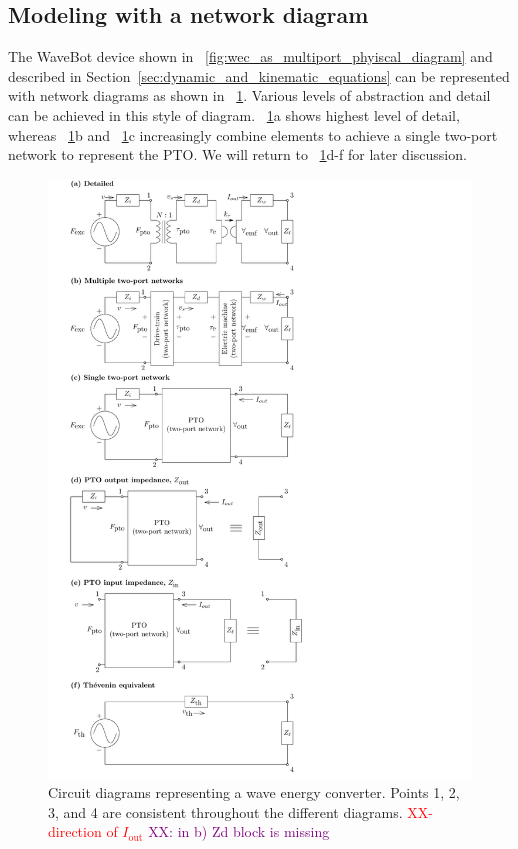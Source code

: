 \documentclass[lettersize,journal]{IEEEtran}
\newcommand{\rc}[1]{\textcolor{red}{#1}}
\newcommand{\dg}[1]{\textcolor{purple}{#1}}
\begin{document}
\subsection{Modeling with a network diagram}\label{sec:modeling_with_a_network_diagram}

The WaveBot device shown in \figurename~\ref{fig:wec_as_multiport_phyiscal_diagram} and described in Section~\ref{sec:dynamic_and_kinematic_equations} can be represented with network diagrams as shown in \figurename~\ref{fig:wec_as_multiport_circuits}.
Various levels of abstraction and detail can be achieved in this style of diagram.
\figurename~\ref{fig:wec_as_multiport_circuits}a shows highest level of detail, whereas \figurename~\ref{fig:wec_as_multiport_circuits}b and \figurename~\ref{fig:wec_as_multiport_circuits}c increasingly combine elements to achieve a single two-port network to represent the PTO.
We will return to \figurename~\ref{fig:wec_as_multiport_circuits}d-f for later discussion.

\begin{figure}[tb]
        \centering
        \includegraphics[width=1\columnwidth]{wec_as_multiport_circuits.pdf}
        \caption{Circuit diagrams representing a wave energy converter. Points 1, 2, 3, and 4 are consistent throughout the different diagrams. \rc{XX-direction of $I_{\textrm{out}}$} \dg{XX: in b) Zd block is missing}}
        \label{fig:wec_as_multiport_circuits}
\end{figure}
\end{document}
